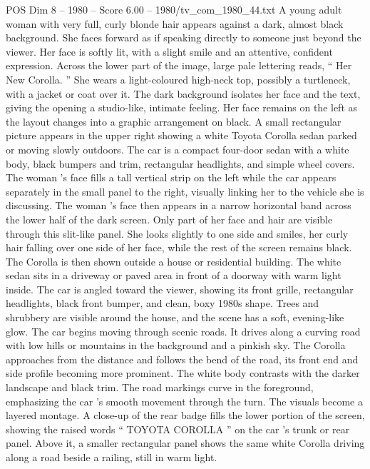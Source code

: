 \begin{textsample}{POS Dim 8 – 1980 – Score 6.00 – 1980/tv\_com\_1980\_44.txt}  \label{ex:f8_pos_046}
A young adult woman with very full, curly blonde hair appears against a dark, almost black background.
She faces forward as if speaking directly to someone just beyond the viewer.
Her face is softly lit, with a slight smile and an attentive, confident expression.
Across the lower part of the image, large pale lettering reads, “ Her New Corolla. ” She wears a light-coloured high-neck top, possibly a turtleneck, with a jacket or coat over it.
The dark background isolates her face and the text, giving the opening a studio-like, intimate feeling.
Her face remains on the left as the layout changes into a graphic arrangement on black.
A small rectangular picture appears in the upper right showing a white Toyota Corolla sedan parked or moving slowly outdoors.
The car is a compact four-door sedan with a white body, black bumpers and trim, rectangular headlights, and simple wheel covers.
The woman ’s face fills a tall vertical strip on the left while the car appears separately in the small panel to the right, visually linking her to the vehicle she is discussing.
The woman ’s face then appears in a narrow horizontal band across the lower half of the dark screen.
Only part of her face and hair are visible through this slit-like panel.
She looks slightly to one side and smiles, her curly hair falling over one side of her face, while the rest of the screen remains black.
The Corolla is then shown outside a house or residential building.
The white sedan sits in a driveway or paved area in front of a doorway with warm light inside.
The car is angled toward the viewer, showing its front grille, rectangular headlights, black front bumper, and clean, boxy 1980s shape.
Trees and shrubbery are visible around the house, and the scene has a soft, evening-like glow.
The car begins moving through scenic roads.
It drives along a curving road with low hills or mountains in the background and a pinkish sky.
The Corolla approaches from the distance and follows the bend of the road, its front end and side profile becoming more prominent.
The white body contrasts with the darker landscape and black trim.
The road markings curve in the foreground, emphasizing the car ’s smooth movement through the turn.
The visuals become a layered montage.
A close-up of the rear badge fills the lower portion of the screen, showing the raised words “ TOYOTA COROLLA ” on the car ’s trunk or rear panel.
Above it, a smaller rectangular panel shows the same white Corolla driving along a road beside a railing, still in warm light.

\end{textsample}
